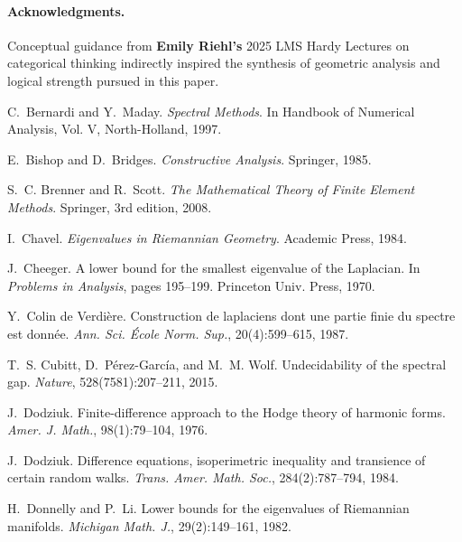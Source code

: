 \documentclass[11pt]{article}
\theoremstyle{definition}\newtheorem{definition}[theorem]{Definition}
\theoremstyle{remark}\newtheorem{remark}[theorem]{Remark}
\begin{document}
\paragraph{Acknowledgments.}
Conceptual guidance from \textbf{Emily Riehl's} 2025 LMS Hardy Lectures
on categorical thinking indirectly inspired the synthesis of geometric
analysis and logical strength pursued in this paper. 
\begin{thebibliography}{99}

C.~Bernardi and Y.~Maday.
\newblock \emph{Spectral Methods}.
\newblock In Handbook of Numerical Analysis, Vol. V, North-Holland, 1997.

E.~Bishop and D.~Bridges.
\newblock \emph{Constructive Analysis}.
\newblock Springer, 1985.

S.~C. Brenner and R.~Scott.
\newblock \emph{The Mathematical Theory of Finite Element Methods}.
\newblock Springer, 3rd edition, 2008.

I.~Chavel.
\newblock \emph{Eigenvalues in Riemannian Geometry}.
\newblock Academic Press, 1984.

J.~Cheeger.
\newblock A lower bound for the smallest eigenvalue of the {L}aplacian.
\newblock In \emph{Problems in Analysis}, pages 195--199. Princeton Univ. Press, 1970.

Y.~Colin de Verdière.
\newblock Construction de laplaciens dont une partie finie du spectre est donnée.
\newblock \emph{Ann. Sci. École Norm. Sup.}, 20(4):599--615, 1987.

T.~S. Cubitt, D.~Pérez-García, and M.~M. Wolf.
\newblock Undecidability of the spectral gap.
\newblock \emph{Nature}, 528(7581):207--211, 2015.

J.~Dodziuk.
\newblock Finite-difference approach to the Hodge theory of harmonic forms.
\newblock \emph{Amer. J. Math.}, 98(1):79--104, 1976.

J.~Dodziuk.
\newblock Difference equations, isoperimetric inequality and transience of certain random walks.
\newblock \emph{Trans. Amer. Math. Soc.}, 284(2):787--794, 1984.

H.~Donnelly and P.~Li.
\newblock Lower bounds for the eigenvalues of {R}iemannian manifolds.
\newblock \emph{Michigan Math. J.}, 29(2):149--161, 1982.


\end{thebibliography}
\end{document}
